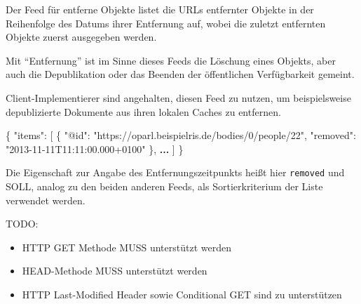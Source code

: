 \documentclass[,a4paper]{article}
\newenvironment{Shaded}{}{}
\newcommand{\DataTypeTok}[1]{\textcolor[rgb]{0.56,0.13,0.00}{{#1}}}
\newcommand{\StringTok}[1]{\textcolor[rgb]{0.25,0.44,0.63}{{#1}}}
\newcommand{\ErrorTok}[1]{\textcolor[rgb]{1.00,0.00,0.00}{\textbf{{#1}}}}
\newcommand{\NormalTok}[1]{{#1}}
\begin{document}

Der Feed für entferne Objekte listet die URLs entfernter Objekte in der
Reihenfolge des Datums ihrer Entfernung auf, wobei die zuletzt
entfernten Objekte zuerst ausgegeben werden.

Mit ``Entfernung'' ist im Sinne dieses Feeds die Löschung eines Objekts,
aber auch die Depublikation oder das Beenden der öffentlichen
Verfügbarkeit gemeint.

Client-Implementierer sind angehalten, diesen Feed zu nutzen, um
beispielsweise depublizierte Dokumente aus ihren lokalen Caches zu
entfernen.

\begin{Shaded}
\begin{Highlighting}[]
\NormalTok{\{}
    \DataTypeTok{"items"}\NormalTok{: [}
        \NormalTok{\{}
            \DataTypeTok{"@id"}\NormalTok{: }\StringTok{"https://oparl.beispielris.de/bodies/0/people/22"}\NormalTok{,}
            \DataTypeTok{"removed"}\NormalTok{: }\StringTok{"2013-11-11T11:11:00.000+0100"}
        \NormalTok{\},}
        \ErrorTok{...}
    \NormalTok{]}
\NormalTok{\}}
\end{Highlighting}
\end{Shaded}

Die Eigenschaft zur Angabe des Entfernungszeitpunkts heißt hier
\texttt{removed} und SOLL, analog zu den beiden anderen Feeds, als
Sortierkriterium der Liste verwendet werden.


TODO:

\begin{itemize}
\itemsep1pt\parskip0pt
\item
  HTTP GET Methode MUSS unterstützt werden
\item
  HEAD-Methode MUSS unterstützt werden
\item
  HTTP Last-Modified Header sowie Conditional GET sind zu unterstützen
\end{itemize}
\end{document}
